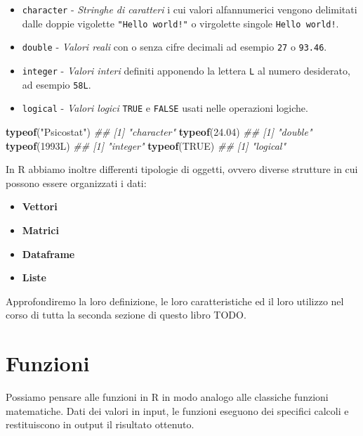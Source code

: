 \documentclass[
]{book}
\newenvironment{Shaded}{\begin{snugshade}}{\end{snugshade}}
\newcommand{\CommentTok}[1]{\textcolor[rgb]{0.56,0.35,0.01}{\textit{#1}}}
\newcommand{\FloatTok}[1]{\textcolor[rgb]{0.00,0.00,0.81}{#1}}
\newcommand{\KeywordTok}[1]{\textcolor[rgb]{0.13,0.29,0.53}{\textbf{#1}}}
\newcommand{\NormalTok}[1]{#1}
\newcommand{\OtherTok}[1]{\textcolor[rgb]{0.56,0.35,0.01}{#1}}
\newcommand{\StringTok}[1]{\textcolor[rgb]{0.31,0.60,0.02}{#1}}
\providecommand{\tightlist}{%
  \setlength{\itemsep}{0pt}\setlength{\parskip}{0pt}}
\begin{document}
\begin{itemize}
\tightlist
\item
  \texttt{character} - \emph{Stringhe di caratteri} i cui valori alfannumerici vengono delimitati dalle doppie vigolette \texttt{"Hello\ world!"} o virgolette singole \texttt{\textquotesingle{}Hello\ world!\textquotesingle{}}.
\item
  \texttt{double} - \emph{Valori reali} con o senza cifre decimali ad esempio \texttt{27} o \texttt{93.46}.
\item
  \texttt{integer} - \emph{Valori interi} definiti apponendo la lettera \texttt{L} al numero desiderato, ad esempio \texttt{58L}.
\item
  \texttt{logical} - \emph{Valori logici} \texttt{TRUE} e \texttt{FALSE} usati nelle operazioni logiche.
\end{itemize}

\begin{Shaded}
\begin{Highlighting}[]
\KeywordTok{typeof}\NormalTok{(}\StringTok{"Psicostat"}\NormalTok{)}
\CommentTok{## [1] "character"}
\KeywordTok{typeof}\NormalTok{(}\FloatTok{24.04}\NormalTok{)}
\CommentTok{## [1] "double"}
\KeywordTok{typeof}\NormalTok{(1993L)}
\CommentTok{## [1] "integer"}
\KeywordTok{typeof}\NormalTok{(}\OtherTok{TRUE}\NormalTok{)}
\CommentTok{## [1] "logical"}
\end{Highlighting}
\end{Shaded}

In R abbiamo inoltre differenti tipologie di oggetti, ovvero diverse strutture in cui possono essere organizzati i dati:

\begin{itemize}
\tightlist
\item
  \textbf{Vettori}
\item
  \textbf{Matrici}
\item
  \textbf{Dataframe}
\item
  \textbf{Liste}
\end{itemize}

Approfondiremo la loro definizione, le loro caratteristiche ed il loro utilizzo nel corso di tutta la seconda sezione di questo libro TODO.

\hypertarget{functions-def}{%
\section{Funzioni}\label{functions-def}}

Possiamo pensare alle funzioni in R in modo analogo alle classiche funzioni matematiche. Dati dei valori in input, le funzioni eseguono dei specifici calcoli e restituiscono in output il risultato ottenuto.
\end{document}
